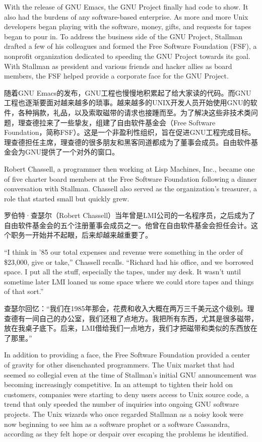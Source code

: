 \ifdefined\eng
With the release of GNU Emacs, the GNU Project finally had code to show. It also had the burdens of any software-based enterprise. As more and more Unix developers began playing with the software, money, gifts, and requests for tapes began to pour in. To address the business side of the GNU Project, Stallman drafted a few of his colleagues and formed the Free Software Foundation (FSF), a nonprofit organization dedicated to speeding the GNU Project towards its goal. With Stallman as president and various friends and hacker allies as board members, the FSF helped provide a corporate face for the GNU Project.
\fi

\ifdefined\chs
随着GNU Emacs的发布，GNU工程也慢慢地积累起了给大家读的代码。而GNU工程也逐渐要面对越来越多的琐事。越来越多的UNIX开发人员开始使用GNU的软件，各种捐款，礼品，以及索取磁带的请求也接踵而至。为了解决这些非技术类问题，理查德拉来了一些挚友，组建了自由软件基金会（Free Software Foundation，简称FSF）。这是一个非盈利性组织，旨在促进GNU工程完成目标。理查德担任主席，理查德的很多朋友和黑客同道都成为了董事会成员。自由软件基金会为GNU提供了一个对外的窗口。
\fi

\ifdefined\eng
Robert Chassell, a programmer then working at Lisp Machines, Inc., became one of five charter board members at the Free Software Foundation following a dinner conversation with Stallman. Chassell also served as the organization's treasurer, a role that started small but quickly grew.
\fi

\ifdefined\chs
罗伯特·查瑟尔（Robert Chassell）当年曾是LMI公司的一名程序员，之后成为了自由软件基金会的五个注册董事会成员之一。他曾在自由软件基金会担任会计。这个职务一开始并不起眼，后来却越来越重要了。
\fi

\ifdefined\eng
``I think in '85 our total expenses and revenue were something in the order of \$23,000, give or take,'' Chassell recalls. ``Richard had his office, and we borrowed space. I put all the stuff, especially the tapes, under my desk. It wasn't until sometime later LMI loaned us some space where we could store tapes and things of that sort.''
\fi

\ifdefined\chs
查瑟尔回忆：“我们在1985年那会，花费和收入大概在两万三千美元这个级别。理查德有一间自己的办公室，我们还租了点地方。我把所有东西，尤其是很多磁带，放在我桌子底下。后来，LMI借给我们一点地方，我们才把磁带和类似的东西放在了那里。”
\fi

\ifdefined\eng
In addition to providing a face, the Free Software Foundation provided a center of gravity for other disenchanted programmers. The Unix market that had seemed so collegial even at the time of Stallman's initial GNU announcement was becoming increasingly competitive. In an attempt to tighten their hold on customers, companies were starting to deny users access to Unix source code, a trend that only speeded the number of inquiries into ongoing GNU software projects. The Unix wizards who once regarded Stallman as a noisy kook were now beginning to see him as a software prophet or a software Cassandra, according as they felt hope or despair over escaping the problems he identified.
\fi


